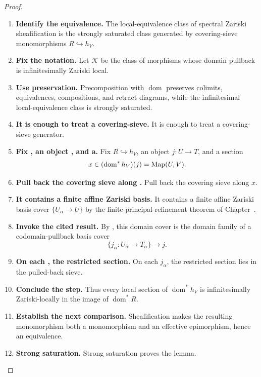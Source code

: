 \begin{proof}
\leavevmode
\begin{enumerate}[label=\textup{(\arabic*)}]
    \item \textbf{Identify the equivalence.}
    The local-equivalence class of spectral Zariski sheafification is the strongly saturated
    class generated by covering-sieve monomorphisms \(R\hookrightarrow h_V\).

    \item \textbf{Fix the notation.}
    Let \(\mathcal K\) be the class of morphisms whose domain pullback is infinitesimally Zariski
    local.

    \item \textbf{Use preservation.}
    Precomposition with \(\operatorname{dom}\) preserves colimits, equivalences, compositions, and retract
    diagrams, while the infinitesimal local-equivalence class is strongly saturated.

    \item \textbf{It is enough to treat a covering-sieve.}
    It is enough to treat a covering-sieve generator.

    \item \textbf{Fix , an object , and a.}
    Fix \(R\hookrightarrow h_V\), an object \(j:U\to T\), and a section
    \[
        x\in(\operatorname{dom}^*h_V)(j)=\operatorname{Map}(U,V).
    \]

    \item \textbf{Pull back the covering sieve along .}
    Pull back the covering sieve along \(x\).

    \item \textbf{It contains a finite affine Zariski basis.}
    It contains a finite affine Zariski basis cover \(\{U_\alpha\to U\}\) by the
    finite-principal-refinement theorem of Chapter~.

    \item \textbf{Invoke the cited result.}
    By , this domain cover is the domain
    family of a codomain-pullback basis cover
    \[
        \{j_\alpha:U_\alpha\to T_\alpha\}\longrightarrow j.
    \]

    \item \textbf{On each , the restricted section.}
    On each \(j_\alpha\), the restricted section lies in the pulled-back sieve.

    \item \textbf{Conclude the step.}
    Thus every local section of \(\operatorname{dom}^*h_V\) is infinitesimally Zariski-locally in the image of
    \(\operatorname{dom}^*R\).

    \item \textbf{Establish the next comparison.}
    Sheafification makes the resulting monomorphism both a monomorphism and an effective
    epimorphism, hence an equivalence.

    \item \textbf{Strong saturation.}
    Strong saturation proves the lemma.
\end{enumerate}
\end{proof}

